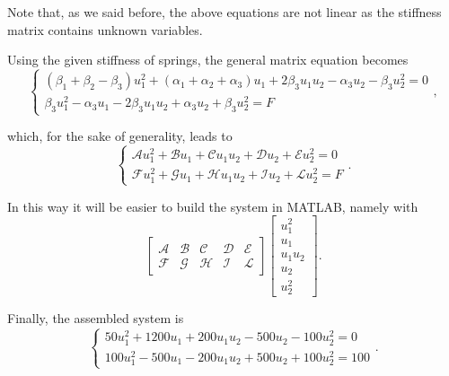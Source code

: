 Note that, as we said before, the above equations are not linear as the stiffness matrix contains unknown variables.

Using the given stiffness of springs, the general matrix equation becomes
\begin{equation*}
\label{eq:spring_4}
\begin{cases}
\left( \beta_1+\beta_2-\beta_3 \right)u_1^2 +\left( \alpha_1+\alpha_2+\alpha_3 \right)u_1+2\beta_3u_1u_2-\alpha_3u_2-\beta_3u_2^2=0 \\
\beta_3u_1^2-\alpha_3u_1-2\beta_3u_1u_2+\alpha_3u_2+\beta_3u_2^2=F
\end{cases},
\end{equation*}

which, for the sake of generality, leads to
\begin{equation*}
\label{eq:spring_5}
\begin{cases}
\mathcal{A}u_1^2 +\mathcal{B}u_1+\mathcal{C}u_1u_2+\mathcal{D}u_2+\mathcal{E}u_2^2=0 \\
\mathcal{F}u_1^2 +\mathcal{G}u_1+\mathcal{H}u_1u_2+\mathcal{I}u_2+\mathcal{L}u_2^2=F
\end{cases}.
\end{equation*}

In this way it will be easier to build the system in MATLAB, namely with
\begin{equation}
\label{eq:spring_6}
\left[
\begin{array}{ccccc}
\mathcal{A} & \mathcal{B} & \mathcal{C} & \mathcal{D} & \mathcal{E} \\
\mathcal{F} & \mathcal{G} & \mathcal{H} & \mathcal{I} & \mathcal{L}
\end{array}
\right]
\left[
\begin{array}{c}
u_1^2 \\
u_1 \\
u_1u_2 \\
u_2 \\
u_2^2
\end{array}
\right].
\end{equation}

Finally, the assembled system is
\begin{equation*}
\label{eq:spring_7}
\begin{cases}
50u_1^2+1200u_1+200u_1u_2-500u_2-100u_2^2=0 \\
100u_1^2-500u_1-200u_1u_2+500u_2+100u_2^2=100
\end{cases}.
\end{equation*}

